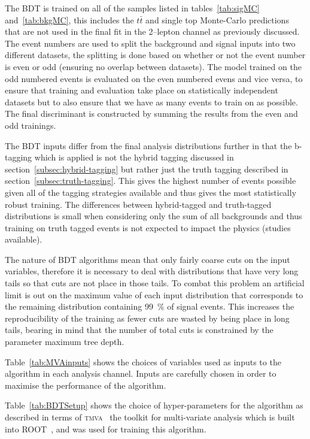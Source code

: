 The BDT is trained on all of the samples listed in tables~\ref{tab:sigMC}
and~\ref{tab:bkgMC}, this includes the $t\bar{t}$ and single top Monte-Carlo
predictions that are not used in the final fit in the 2--lepton channel as
previously discussed. The event numbers are used to split the background and
signal inputs into two different datasets, the splitting is done based on
whether or not the event number is even or odd (ensuring no overlap between
datasets). The model trained on the odd numbered events is evaluated on the even
numbered evens and vice versa, to ensure that training and evaluation take place
on statistically independent datasets but to also ensure that we have as many
events to train on as possible. The final discriminant is constructed by summing
the results from the even and odd trainings.

The BDT inputs differ from the final analysis distributions further in that the
b-tagging which is applied is not the hybrid tagging discussed in
section~\ref{subsec:hybrid-tagging} but rather just the truth tagging described
in section~\ref{subsec:truth-tagging}. This gives the highest number of events
possible given all of the tagging strategies available and thus gives the most
statistically robust training. The differences between hybrid-tagged and
truth-tagged distributions is small when considering only the sum of all
backgrounds and thus training on truth tagged events is not expected to impact
the physics (studies available).

The nature of BDT algorithms mean that only fairly coarse cuts on the input
variables, therefore it is necessary to deal with distributions that have very
long tails so that cuts are not place in those tails. To combat this problem an
artificial limit is out on the maximum value of each input distribution that
corresponds to the remaining distribution containing 99~\% of signal events.
This increases the reproducibility of the training as fewer cuts are wasted by
being place in long tails, bearing in mind that the number of total cuts is
constrained by the parameter maximum tree depth.

Table~\ref{tab:MVAinputs} shows the choices of variables used as inputs to the
algorithm in each analysis channel. Inputs are carefully chosen in order to
maximise the performance of the algorithm.

Table~\ref{tab:BDTSetup} shows the choice of hyper-parameters for the algorithm
as described in terms of \textsc{tmva}~\cite{TMVA} the toolkit for multi-variate
analysis which is built into \textsc{ROOT}~\cite{ROOT}, and was used for
training this algorithm.



